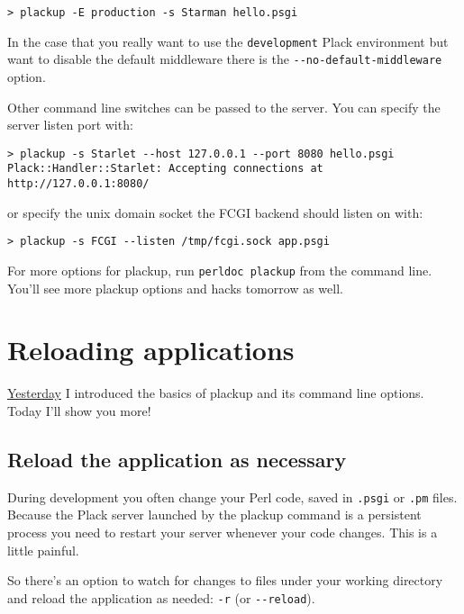\begin{lstlisting}
> plackup -E production -s Starman hello.psgi
\end{lstlisting}

In the case that you really want to use the \lstinline!development!
Plack environment but want to disable the default middleware there is
the \lstinline!--no-default-middleware! option.

Other command line switches can be passed to the server. You can specify
the server listen port with:

\begin{lstlisting}
> plackup -s Starlet --host 127.0.0.1 --port 8080 hello.psgi
Plack::Handler::Starlet: Accepting connections at http://127.0.0.1:8080/
\end{lstlisting}

or specify the unix domain socket the FCGI backend should listen on
with:

\begin{lstlisting}
> plackup -s FCGI --listen /tmp/fcgi.sock app.psgi
\end{lstlisting}

For more options for plackup, run \lstinline!perldoc plackup! from the
command line. You'll see more plackup options and hacks tomorrow as
well.

\chapter{Reloading
applications}\label{day-4-reloading-applications}

\href{http://advent.plackperl.org/2009/12/day-3-using-plackup.html}{Yesterday}
I introduced the basics of plackup and its command line options. Today
I'll show you more!

\section{Reload the application as
necessary}\label{reload-the-application-as-necessary}

During development you often change your Perl code, saved in
\lstinline!.psgi! or \lstinline!.pm! files. Because the Plack server
launched by the plackup command is a persistent process you need to
restart your server whenever your code changes. This is a little
painful.

So there's an option to watch for changes to files under your working
directory and reload the application as needed: \lstinline!-r! (or
\lstinline!--reload!).

